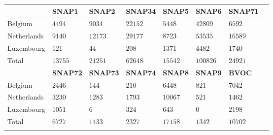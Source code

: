 \begin{tabular}{llllllll}
    \hline \hline
    & \textbf{SNAP1} & \textbf{SNAP2} & \textbf{SNAP34} & \textbf{SNAP5} & \textbf{SNAP6} & \textbf{SNAP71} \\
    \hline
    Belgium     & $4494$ & $9034$  & $22152$   & $5448$ & $42809$ & $6592$ \\
    Netherlands & $9140$ & $12173$ & $29177$   & $8723$ & $53535$ & $16589$ \\
    Luxembourg  & $121$  & $44$    & $208$     & $1371$ & $4482$  & $1740$ \\
    \hline
    Total       & $13755$ & $21251$ & $62648$  & $15542$ & $100826$ & $24921$ \\
    \hline
    & \textbf{SNAP72} & \textbf{SNAP73} & \textbf{SNAP74} & \textbf{SNAP8} & \textbf{SNAP9} & \textbf{BVOC} \\
    \hline
    Belgium     & $2446$ & $144$  & $210$  & $6448$  & $821$  & $7042$ \\
    Netherlands & $3230$ & $1283$ & $1793$ & $10067$ & $521$  & $1462$ \\
    Luxembourg  & $1051$ & $6$    & $324$  & $643$   & $0$    & $2198$ \\
    \hline
    Total       & $6727$ & $1433$ & $2327$ & $17158$ & $1342$ & $10702$ \\
    \hline \hline
    \label{t:NMVOC_emissions}%
\end{tabular}%
